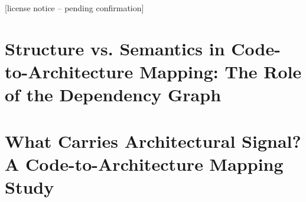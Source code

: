 \begin{appendices}
\vspace{10pt}
\noindent
{\footnotesize [license notice -- pending confirmation]}




\renewcommand{\appendixname}{Paper}
\chapter{Structure vs. Semantics in Code-to-Architecture Mapping: The Role of the Dependency Graph}\label{app:publ-c2a_mapping}
\chaptermark{\label{app:publ-c2a_mapping}}




\chapter{What Carries Architectural Signal? A Code-to-Architecture Mapping Study}\label{app:publ-hetmap}
\chaptermark{\label{app:publ-hetmap}}



\end{appendices}
